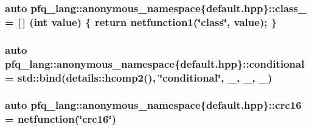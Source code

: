 \hypertarget{namespacepfq__lang_1_1anonymous__namespace_02default_8hpp_03_a27a683ef93570a66844e1a0106e6336a}{
\subsubsection[{class\+\_\+}]{\setlength{\rightskip}{0pt plus 5cm}auto pfq\+\_\+lang\+::anonymous\+\_\+namespace\{default.\+hpp\}\+::class\+\_\+ = \mbox{[}$\,$\mbox{]} (int value) \{ return {\bf netfunction1}(\char`\"{}class\char`\"{}, value); \}}}\label{namespacepfq__lang_1_1anonymous__namespace_02default_8hpp_03_a27a683ef93570a66844e1a0106e6336a}
\hypertarget{namespacepfq__lang_1_1anonymous__namespace_02default_8hpp_03_a022d0075edf2fff575b93377aec0c228}{
\subsubsection[{conditional}]{\setlength{\rightskip}{0pt plus 5cm}auto pfq\+\_\+lang\+::anonymous\+\_\+namespace\{default.\+hpp\}\+::conditional = std\+::bind(details\+::hcomp2(), \char`\"{}conditional\char`\"{}, \+\_, \+\_, \+\_)}}\label{namespacepfq__lang_1_1anonymous__namespace_02default_8hpp_03_a022d0075edf2fff575b93377aec0c228}
\hypertarget{namespacepfq__lang_1_1anonymous__namespace_02default_8hpp_03_aaa12e1daf6bd2719a3b8592e673acf84}{
\subsubsection[{crc16}]{\setlength{\rightskip}{0pt plus 5cm}auto pfq\+\_\+lang\+::anonymous\+\_\+namespace\{default.\+hpp\}\+::crc16 = {\bf netfunction}(\char`\"{}crc16\char`\"{})}}\label{namespacepfq__lang_1_1anonymous__namespace_02default_8hpp_03_aaa12e1daf6bd2719a3b8592e673acf84}
